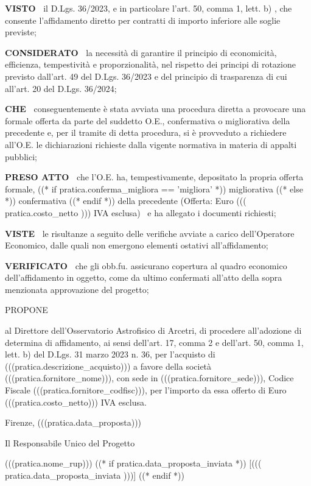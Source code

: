 \textbf{VISTO~}
il D.Lgs. 36/2023, e in particolare l'art. 50, comma 1, lett. b) , che
consente l'affidamento diretto per contratti di importo inferiore alle
soglie previste;


\textbf{CONSIDERATO~}
la necessità di garantire il principio di economicità, efficienza,
tempestività e proporzionalità, nel rispetto dei principi di rotazione
previsto dall'art. 49 del D.Lgs. 36/2023 e del principio di trasparenza
di cui all'art. 20 del D.Lgs. 36/2024;


\textbf{CHE~}
conseguentemente è stata avviata una procedura diretta a provocare una
formale offerta da parte del suddetto O.E., confermativa o migliorativa
della precedente e, per il tramite di detta procedura, si è provveduto
a richiedere all'O.E. le dichiarazioni richieste dalla vigente normativa
in materia di appalti pubblici;


\textbf{PRESO ATTO~}
che l'O.E. ha, tempestivamente, depositato la propria offerta formale,
((* if pratica.conferma_migliora == 'migliora' *)) migliorativa
((* else *)) confermativa ((* endif *))
della precedente (Offerta: Euro ((( pratica.costo_netto )))
IVA esclusa)  e ha allegato i documenti richiesti;


\textbf{VISTE~}
le risultanze a seguito delle verifiche avviate a carico dell'Operatore
Economico, dalle quali non emergono elementi ostativi all'affidamento;


\textbf{VERIFICATO~}
che gli obb.fu. assicurano copertura al quadro economico dell'affidamento
in oggetto, come da ultimo confermati all'atto della sopra menzionata
approvazione del progetto;  



\begin{center}
PROPONE
\end{center}

al Direttore dell'Osservatorio Astrofisico di Arcetri, di procedere
all'adozione di determina di affidamento, ai sensi dell'art. 17, comma
2 e dell'art. 50, comma 1, lett. b) del D.Lgs. 31 marzo 2023 n. 36, per
l'acquisto di (((pratica.descrizione_acquisto))) a favore della società
(((pratica.fornitore_nome))), con sede in (((pratica.fornitore_sede))),
Codice Fiscale (((pratica.fornitore_codfisc))), per l'importo da essa
offerto di Euro (((pratica.costo_netto))) IVA esclusa.


Firenze, (((pratica.data_proposta)))

\begin{flushright}
\begin{minipage}[c]{11cm}
\begin{center}
Il Responsabile Unico del Progetto

(((pratica.nome_rup))) ((* if pratica.data_proposta_inviata *)) [((( pratica.data_proposta_inviata )))] ((* endif *))

\end{center}
\end{minipage}
\end{flushright}


